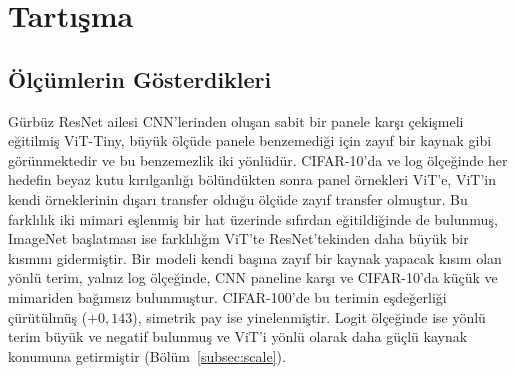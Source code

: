 \section{Tartışma}
\label{sec:discussion}

\subsection{Ölçümlerin Gösterdikleri}
\label{subsec:findings}

Gürbüz ResNet ailesi CNN'lerinden oluşan sabit bir panele karşı çekişmeli eğitilmiş ViT-Tiny, büyük ölçüde panele benzemediği için zayıf bir kaynak gibi görünmektedir ve bu benzemezlik iki yönlüdür. CIFAR-10'da ve log ölçeğinde her hedefin beyaz kutu kırılganlığı bölündükten sonra panel örnekleri ViT'e, ViT'in kendi örneklerinin dışarı transfer olduğu ölçüde zayıf transfer olmuştur. Bu farklılık iki mimari eşlenmiş bir hat üzerinde sıfırdan eğitildiğinde de bulunmuş, ImageNet başlatması ise farklılığın ViT'te ResNet'tekinden daha büyük bir kısmını gidermiştir. Bir modeli kendi başına zayıf bir kaynak yapacak kısım olan yönlü terim, yalnız log ölçeğinde, CNN paneline karşı ve CIFAR-10'da küçük ve mimariden bağımsız bulunmuştur. CIFAR-100'de bu terimin eşdeğerliği çürütülmüş ($+0{,}143$), simetrik pay ise yinelenmiştir. Logit ölçeğinde ise yönlü terim büyük ve negatif bulunmuş ve ViT'i yönlü olarak daha güçlü kaynak konumuna getirmiştir (Bölüm~\ref{subsec:scale}).

